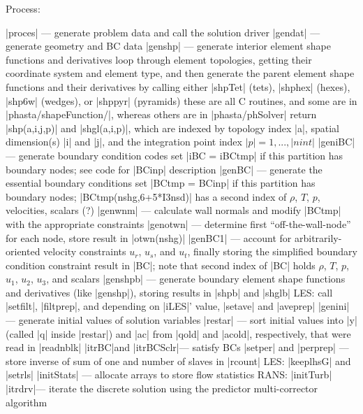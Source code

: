 \documentclass[11pt]{article}
\begin{document}
Process:
\begin{outline}[deep]
\1 |proces| --- generate problem data and call the solution driver
	\2 |gendat| --- generate geometry and BC data
		\3 |genshp| --- generate interior element shape functions and derivatives
			\4 loop through element topologies, getting their coordinate system and element type, and then generate the parent element shape functions and their derivatives by calling either |shpTet| (tets), |shphex| (hexes), |shp6w| (wedges), or |shppyr| (pyramids)
			\4 these are all C routines, and some are in |phasta/shapeFunction/|, whereas others are in |phasta/phSolver|
			\4 return |shp(a,i,j,p)| and |shgl(a,i,p)|, which are indexed by topology index |a|, spatial dimension(s) |i| and |j|, and the integration point index $|p| = 1, ..., |nint|$
		\3 |geniBC| --- generate boundary condition codes
			\4 set |iBC = iBCtmp| if this partition has boundary nodes; see code for |BCinp| description
		\3 |genBC| --- generate the essential boundary conditions
			\4 set |BCtmp = BCinp| if this partition has boundary nodes; |BCtmp(nshg,6+5*I3nsd)| has a second index of $\rho$, $T$, $p$, velocities, scalars (?)
			\4 |genwnm| --- calculate wall normals and modify |BCtmp| with the appropriate constraints
			\4 |genotwn| --- determine first ``off-the-wall-node'' for each node, store result in |otwn(nshg)|
			\4 |genBC1| --- account for arbitrarily-oriented velocity constraints $u_r$, $u_s$, and $u_t$, finally storing the simplified boundary condition constraint result in |BC|; note that second index of |BC| holds $\rho$, $T$, $p$, $u_1$, $u_2$, $u_3$, and scalars
		\3 |genshpb| --- generate boundary element shape functions and derivatives (like |genshp|), storing results in |shpb| and |shglb|
		\3 LES: call |setfilt|, |filtprep|, and depending on |iLES|' value, |setave| and |aveprep|
		\3 |genini| --- generate initial values of solution variables
			\4 |restar| --- sort initial values into |y| (called |q| inside |restar|) and |ac| from |qold| and |acold|, respectively, that were read in |readnblk|
			\4 |itrBC|\ra and |itrBCSclr|\ra --- satisfy BCs
	\2 |setper| and |perprep| --- store inverse of sum of one and number of slaves in |rcount|
	\2 LES: |keeplhsG| and |setrls|
	\2 |initStats| --- allocate arrays to store flow statistics
	\2 RANS: |initTurb|
	\2 |itrdrv|\ra --- iterate the discrete solution using the predictor multi-corrector algorithm
\end{outline}
\end{document}
